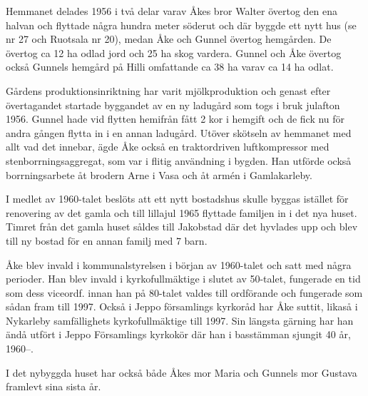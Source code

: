 Hemmanet delades 1956 i två delar varav Åkes bror Walter övertog den ena halvan och flyttade några hundra meter söderut och där byggde ett nytt hus (se nr 27 och Ruotsala nr 20), medan Åke och Gunnel övertog hemgården. De övertog ca 12 ha odlad jord och 25 ha skog vardera. Gunnel och Åke övertog också Gunnels hemgård på Hilli omfattande ca 38 ha varav ca 14 ha odlat.

Gårdens produktionsinriktning har varit mjölkproduktion och genast efter övertagandet startade byggandet av en ny ladugård som togs i bruk julafton 1956. Gunnel hade vid flytten hemifrån fått 2 kor i hemgift och de fick nu för andra gången flytta in i en annan ladugård. Utöver skötseln av hemmanet med allt vad det innebar, ägde Åke också en traktordriven luftkompressor med stenborrningsaggregat, som var i flitig användning i bygden. Han utförde också borrningsarbete åt brodern Arne i Vasa och åt armén i Gamlakarleby.

I medlet av 1960-talet beslöts att ett nytt bostadshus skulle byggas istället för renovering av det gamla och till lillajul 1965 flyttade familjen in i det nya huset. Timret från det gamla huset såldes till Jakobstad där det hyvlades upp och blev till ny bostad för en annan familj med 7 barn.

Åke blev invald i kommunalstyrelsen i början av 1960-talet och satt med några perioder. Han blev invald i kyrkofullmäktige i slutet av 50-talet, fungerade en tid som dess viceordf. innan han på 80-talet valdes till ordförande och fungerade som sådan fram till 1997. Också i Jeppo församlings kyrkoråd har Åke suttit, likaså i Nykarleby samfällighets kyrkofullmäktige till 1997. Sin längsta gärning har han ändå utfört i Jeppo Församlings kyrkokör där han i basstämman sjungit 40 år, 1960--.
\begin{jhchildren}
  \item {}
  \item {}
  \item {}
\end{jhchildren}

I det nybyggda huset har också både Åkes mor Maria och Gunnels mor Gustava framlevt sina sista år.





